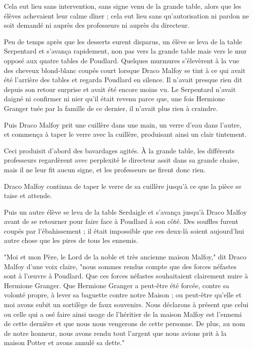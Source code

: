Cela eut lieu sans intervention, sans signe venu de la grande table, alors que les élèves achevaient leur calme dîner ; cela eut lieu sans qu'autorisation ni pardon ne soit demandé ni auprès des professeurs ni auprès du directeur.

Peu de temps après que les desserts eurent disparus, un élève se leva de la table Serpentard et s'avança rapidement, non pas vers la grande table mais vers le mur opposé aux quatre tables de Poudlard. Quelques murmures s'élevèrent à la vue des cheveux blond-blanc coupés court lorsque Draco Malfoy se tint à ce qui avait été l'arrière des tables et regarda Poudlard en silence. Il n'avait presque rien dit depuis son retour surprise et avait été encore moins vu. Le Serpentard n'avait daigné ni confirmer ni nier qu'il était revenu parce que, une fois Hermione Granger tuée par la famille de ce dernier, il n'avait plus rien à craindre.

Puis Draco Malfoy prit une cuillère dans une main, un verre d'eau dans l'autre, et commença à taper le verre avec la cuillère, produisant ainsi un clair tintement.

Ceci produisit d'abord des bavardages agités. À la grande table, les différents professeurs regardèrent avec perplexité le directeur assit dans sa grande chaise, mais il ne leur fit aucun signe, et les professeurs ne firent donc rien.

Draco Malfoy continua de taper le verre de sa cuillère jusqu'à ce que la pièce se taise et attende.

Puis un autre élève se leva de la table Serdaigle et s'avança jusqu'à Draco Malfoy avant de se retourner pour faire face à Poudlard à son côté. Des souffles furent coupés par l'ébahissement ; il était impossible que ces deux-là soient aujourd'hui autre chose que les pires de tous les ennemis.

"Moi et mon Père, le Lord de la noble et très ancienne maison Malfoy," dit Draco Malfoy d'une voix claire, "nous sommes rendus compte que des forces néfastes sont à l'œuvre à Poudlard. Que ces forces néfastes souhaitaient clairement nuire à Hermione Granger. Que Hermione Granger a peut-être été forcée, contre sa volonté propre, à lever sa baguette contre notre Maison ; ou peut-être qu'elle et moi avons subit un sortilège de faux souvenirs. Nous déclarons à présent que celui ou celle qui a osé faire ainsi usage de l'héritier de la maison Malfoy est l'ennemi de cette dernière et que nous nous vengerons de cette personne. De plus, au nom de notre honneur, nous avons rendu tout l'argent que nous avions prit à la maison Potter et avons annulé sa dette."

